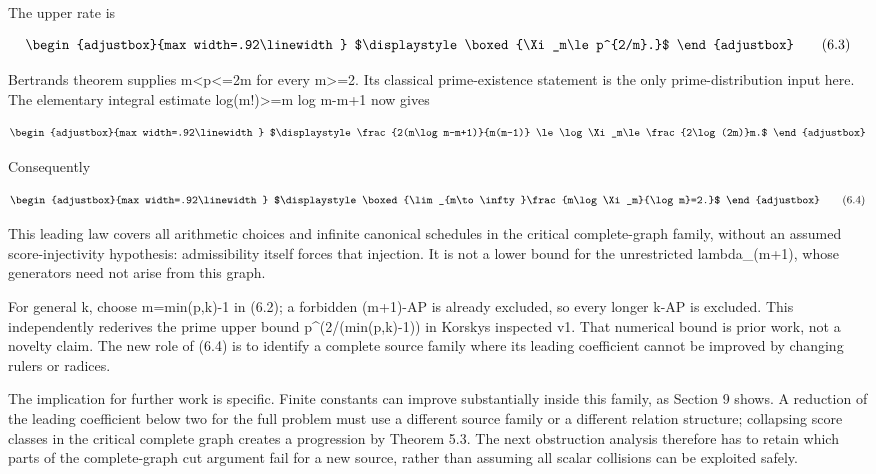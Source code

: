 The upper rate is

\[
\begin{adjustbox}{max width=.92\linewidth}
$\displaystyle \boxed{\Xi_m\le p^{2/m}.}$
\end{adjustbox}
\tag{6.3}
\]

Bertrand\textquotesingle s theorem supplies m\textless p\textless=2m for every m\textgreater=2. Its classical prime-existence statement is the only prime-distribution input here. The elementary integral estimate log(m!)\textgreater=m log m-m+1 now gives

\[
\begin{adjustbox}{max width=.92\linewidth}
$\displaystyle \frac{2(m\log m-m+1)}{m(m-1)}
\le\log\Xi_m\le\frac{2\log(2m)}m.$
\end{adjustbox}
\]

Consequently

\[
\begin{adjustbox}{max width=.92\linewidth}
$\displaystyle \boxed{\lim_{m\to\infty}\frac{m\log\Xi_m}{\log m}=2.}$
\end{adjustbox}
\tag{6.4}
\]

This leading law covers all arithmetic choices and infinite canonical schedules in the critical complete-graph family, without an assumed score-injectivity hypothesis: admissibility itself forces that injection. It is not a lower bound for the unrestricted lambda\_(m+1), whose generators need not arise from this graph.

For general k, choose m=min(p,k)-1 in (6.2); a forbidden (m+1)-AP is already excluded, so every longer k-AP is excluded. This independently rederives the prime upper bound p\^{}(2/(min(p,k)-1)) in Korsky\textquotesingle s inspected v1. That numerical bound is prior work, not a novelty claim. The new role of (6.4) is to identify a complete source family where its leading coefficient cannot be improved by changing rulers or radices.

The implication for further work is specific. Finite constants can improve substantially inside this family, as Section 9 shows. A reduction of the leading coefficient below two for the full problem must use a different source family or a different relation structure; collapsing score classes in the critical complete graph creates a progression by Theorem 5.3. The next obstruction analysis therefore has to retain which parts of the complete-graph cut argument fail for a new source, rather than assuming all scalar collisions can be exploited safely.

